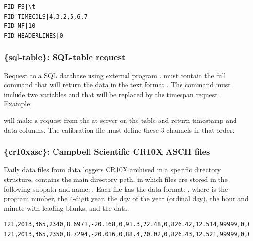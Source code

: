 \begin{lstlisting}[title=\wokey{FID\_*} parameters to read example 2 file.]
FID_FS|\t
FID_TIMECOLS|4,3,2,5,6,7
FID_NF|10
FID_HEADERLINES|0
\end{lstlisting}


\subsubsection{\{sql-table\}: SQL-table request}

Request to a SQL database using external program .  must contain the full command that will return the data in the text format . The command must include two variables  and  that will be replaced by the timespan request. Example:


will make a request from the  at server  on the table  and return timestamp and data columns. The calibration file must define these 3 channels in that order.

\subsubsection{\{cr10xasc\}: Campbell Scientific CR10X ASCII files}

Daily data files from data loggers CR10X archived in a specific directory structure.  contains the main directory path, in which files are stored in the following subpath and name: . Each file has the data format: , where  is the program number,  the 4-digit year,  the day of the year (ordinal day),  the hour and minute with leading blanks, and the data.

\begin{lstlisting}[language={},title=Campbell CR10X format example]
121,2013,365,2340,8.6971,-20.168,0,91.3,22.48,0,826.42,12.514,99999,0,0
121,2013,365,2350,8.7294,-20.016,0,88.4,20.02,0,826.43,12.521,99999,0,0
\end{lstlisting}


